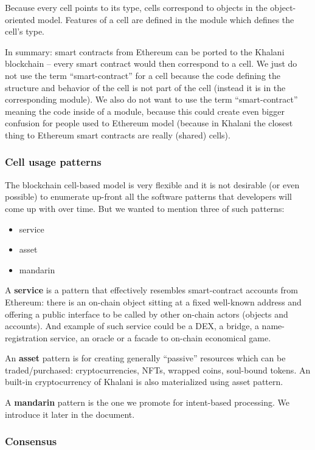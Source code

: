 \documentclass[a4paper]{article}
\begin{document}
Because every cell points to its type, cells correspond to objects in the object-oriented model. Features of a cell are defined in the module which defines the cell’s type.

In summary: smart contracts from Ethereum can be ported to the Khalani blockchain -- every smart contract would then correspond to a cell. We just do not use the term ``smart-contract'' for a cell because the code defining the structure and behavior of the cell is not part of the cell (instead it is in the corresponding module). We also do not want to use the term ``smart-contract'' meaning the code inside of a module, because this could create even bigger confusion for people used to Ethereum model (because in Khalani the closest thing to Ethereum smart contracts are really (shared) cells).

\subsubsection{Cell usage patterns}

The blockchain cell-based model is very flexible and it is not desirable (or even possible) to enumerate up-front all the software patterns that developers will come up with over time. But we wanted to mention three of such patterns:

\begin{itemize}
  \item service
  \item asset
  \item mandarin
\end{itemize}

A \textbf{service} is a pattern that effectively resembles smart-contract accounts from Ethereum: there is an on-chain object sitting at a fixed well-known address and offering a public interface to be called by other on-chain actors (objects and accounts). And example of such service could  be a DEX, a bridge, a name-registration service, an oracle or a facade to on-chain economical game.

An \textbf{asset} pattern is for creating generally ``passive'' resources which can be traded/purchased: cryptocurrencies, NFTs, wrapped coins, soul-bound tokens. An built-in cryptocurrency of Khalani is also materialized using asset pattern.

A \textbf{mandarin} pattern is the one we promote for intent-based processing. We introduce it later in the document.

\subsubsection{Consensus}
\end{document}
